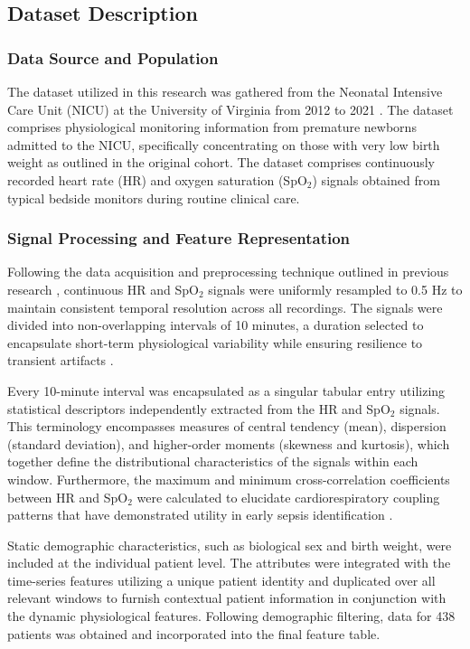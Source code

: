 \documentclass[conference]{IEEEtran}
\begin{document}
\subsection{Dataset Description}

\subsubsection{Data Source and Population}
The dataset utilized in this research was gathered from the Neonatal Intensive Care Unit (NICU) at the University of Virginia from 2012 to 2021 \cite{Moorman2023CardiorespiratorySepsis}. The dataset comprises physiological monitoring information from premature newborns admitted to the NICU, specifically concentrating on those with very low birth weight as outlined in the original cohort. The dataset comprises continuously recorded heart rate (HR) and oxygen saturation (SpO$_2$) signals obtained from typical bedside monitors during routine clinical care.

\subsubsection{Signal Processing and Feature Representation}
Following the data acquisition and preprocessing technique outlined in previous research \cite{Moorman2023CardiorespiratorySepsis}, continuous HR and SpO$_2$ signals were uniformly resampled to 0.5 Hz to maintain consistent temporal resolution across all recordings. The signals were divided into non-overlapping intervals of 10 minutes, a duration selected to encapsulate short-term physiological variability while ensuring resilience to transient artifacts \cite{hero_monitoring}.

Every 10-minute interval was encapsulated as a singular tabular entry utilizing statistical descriptors independently extracted from the HR and SpO$_2$ signals. This terminology encompasses measures of central tendency (mean), dispersion (standard deviation), and higher-order moments (skewness and kurtosis), which together define the distributional characteristics of the signals within each window. Furthermore, the maximum and minimum cross-correlation coefficients between HR and SpO$_2$ were calculated to elucidate cardiorespiratory coupling patterns that have demonstrated utility in early sepsis identification \cite{hero_monitoring,los_ml_mdpi}.

Static demographic characteristics, such as biological sex and birth weight, were included at the individual patient level. The attributes were integrated with the time-series features utilizing a unique patient identity and duplicated over all relevant windows to furnish contextual patient information in conjunction with the dynamic physiological features. Following demographic filtering, data for 438 patients was obtained and incorporated into the final feature table.
\end{document}
